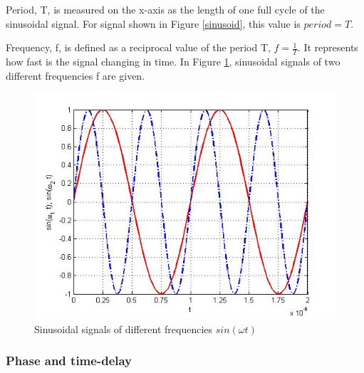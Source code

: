 \documentclass{ximera}
\begin{document}
\begin{definition}
Period, T, is measured on the x-axis as the length of one full cycle of the sinusoidal signal. For signal shown in Figure \ref{sinusoid}, this value is $period=T$. 
\end{definition}

\begin{definition}
Frequency, f,  is defined as a reciprocal value of the period T, $f=\frac{1}{T}$. It represents how fast is the signal changing in time.  In Figure \ref{sinF1F2}, sinusoidal signals of two different frequencies f are given. 

\begin{figure}[htbp]
\includegraphics[scale=0.4]{../jpg/cpef6.jpg}
\caption{Sinusoidal signals of different frequencies $sin ( \omega t)$}
\label{sinF1F2}
\end{figure}

\end{definition}

\subsubsection{Phase and time-delay}
\end{document}
